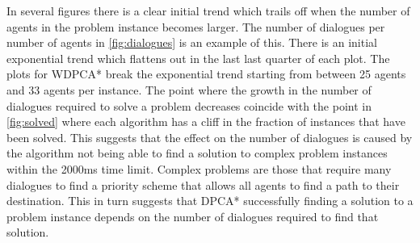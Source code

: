 In several figures there is a clear initial trend which trails off when the
number of agents in the problem instance becomes larger. The number of
dialogues per number of agents in \autoref{fig:dialogues} is an example of
this. There is an initial exponential trend which flattens out in the last last
quarter of each plot. The plots for WDPCA* break the exponential trend starting
from between 25 agents and 33 agents per instance. The point where the growth
in the number of dialogues required to solve a problem decreases coincide with
the point in \autoref{fig:solved} where each algorithm has a cliff in the
fraction of instances that have been solved. This suggests that the effect on
the number of dialogues is caused by the algorithm not being able to find a
solution to complex problem instances within the 2000ms time limit. Complex
problems are those that require many dialogues to find a priority scheme that
allows all agents to find a path to their destination. This in turn suggests
that DPCA* successfully finding a solution to a problem instance depends on the
number of dialogues required to find that solution.

